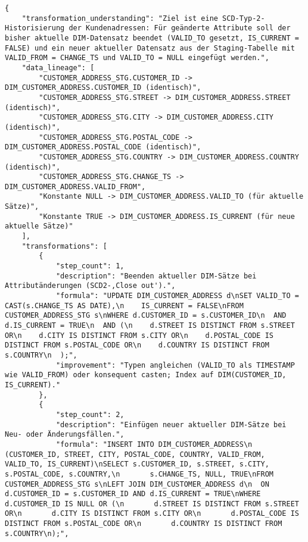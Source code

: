 \begin{lstlisting}[caption={Ausgabe: GPT-5 Anwendungsfall 9 Hauptdurchlauf},label={gpt_case9_prompt1}]
{
    "transformation_understanding": "Ziel ist eine SCD-Typ-2-Historisierung der Kundenadressen: Für geänderte Attribute soll der bisher aktuelle DIM-Datensatz beendet (VALID_TO gesetzt, IS_CURRENT = FALSE) und ein neuer aktueller Datensatz aus der Staging-Tabelle mit VALID_FROM = CHANGE_TS und VALID_TO = NULL eingefügt werden.",
    "data_lineage": [
        "CUSTOMER_ADDRESS_STG.CUSTOMER_ID -> DIM_CUSTOMER_ADDRESS.CUSTOMER_ID (identisch)",
        "CUSTOMER_ADDRESS_STG.STREET -> DIM_CUSTOMER_ADDRESS.STREET (identisch)",
        "CUSTOMER_ADDRESS_STG.CITY -> DIM_CUSTOMER_ADDRESS.CITY (identisch)",
        "CUSTOMER_ADDRESS_STG.POSTAL_CODE -> DIM_CUSTOMER_ADDRESS.POSTAL_CODE (identisch)",
        "CUSTOMER_ADDRESS_STG.COUNTRY -> DIM_CUSTOMER_ADDRESS.COUNTRY (identisch)",
        "CUSTOMER_ADDRESS_STG.CHANGE_TS -> DIM_CUSTOMER_ADDRESS.VALID_FROM",
        "Konstante NULL -> DIM_CUSTOMER_ADDRESS.VALID_TO (für aktuelle Sätze)",
        "Konstante TRUE -> DIM_CUSTOMER_ADDRESS.IS_CURRENT (für neue aktuelle Sätze)"
    ],
    "transformations": [
        {
            "step_count": 1,
            "description": "Beenden aktueller DIM-Sätze bei Attributänderungen (SCD2-,Close out').",
            "formula": "UPDATE DIM_CUSTOMER_ADDRESS d\nSET VALID_TO = CAST(s.CHANGE_TS AS DATE),\n    IS_CURRENT = FALSE\nFROM CUSTOMER_ADDRESS_STG s\nWHERE d.CUSTOMER_ID = s.CUSTOMER_ID\n  AND d.IS_CURRENT = TRUE\n  AND (\n    d.STREET IS DISTINCT FROM s.STREET OR\n    d.CITY IS DISTINCT FROM s.CITY OR\n    d.POSTAL_CODE IS DISTINCT FROM s.POSTAL_CODE OR\n    d.COUNTRY IS DISTINCT FROM s.COUNTRY\n  );",
            "improvement": "Typen angleichen (VALID_TO als TIMESTAMP wie VALID_FROM) oder konsequent casten; Index auf DIM(CUSTOMER_ID, IS_CURRENT)."
        },
        {
            "step_count": 2,
            "description": "Einfügen neuer aktueller DIM-Sätze bei Neu- oder Änderungsfällen.",
            "formula": "INSERT INTO DIM_CUSTOMER_ADDRESS\n  (CUSTOMER_ID, STREET, CITY, POSTAL_CODE, COUNTRY, VALID_FROM, VALID_TO, IS_CURRENT)\nSELECT s.CUSTOMER_ID, s.STREET, s.CITY, s.POSTAL_CODE, s.COUNTRY,\n       s.CHANGE_TS, NULL, TRUE\nFROM CUSTOMER_ADDRESS_STG s\nLEFT JOIN DIM_CUSTOMER_ADDRESS d\n  ON d.CUSTOMER_ID = s.CUSTOMER_ID AND d.IS_CURRENT = TRUE\nWHERE d.CUSTOMER_ID IS NULL OR (\n       d.STREET IS DISTINCT FROM s.STREET OR\n       d.CITY IS DISTINCT FROM s.CITY OR\n       d.POSTAL_CODE IS DISTINCT FROM s.POSTAL_CODE OR\n       d.COUNTRY IS DISTINCT FROM s.COUNTRY\n);",

\end{lstlisting}

